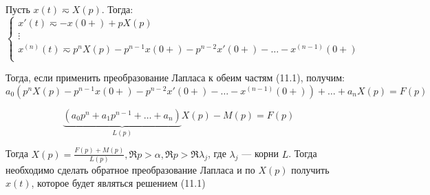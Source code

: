 Пусть \(x(t) \eqsim X(p)\). Тогда:
\begin{equation*}
    \begin{cases}
        x'(t) \eqsim -x(0 +) + pX(p) \\
        \vdots \\
        x^{(n)}(t) \eqsim p^nX(p) - p^{n - 1}x(0 +)  - p^{n - 2}x'(0 +) - \dots - x^{(n - 1)}(0 +)\\
    \end{cases}
\end{equation*}

Тогда, если применить преобразование Лапласа к обеим частям (11.1), получим:
\begin{equation*}
    a_0(p^nX(p) - p^{n - 1}x(0 +)  - p^{n - 2}x'(0 +) - \dots - x^{(n - 1)}(0 +)) + \dots + a_nX(p) = F(p)
\end{equation*}

\begin{equation*}
    \underbrace{(a_0p^n + a_1p^{n - 1} + \dots + a_n)}_{L(p)}X(p) - M(p) = F(p)
\end{equation*}

Тогда \(X(p) = \frac{F(p) + M(p)}{L(p)}, \Re p > \alpha, \Re p > \Re \lambda_j\), где \(\lambda_j\) --- корни \(L\). Тогда необходимо сделать обратное преобразование Лапласа и по \(X(p)\) получить \(x(t)\), которое будет являться решением (11.1)
